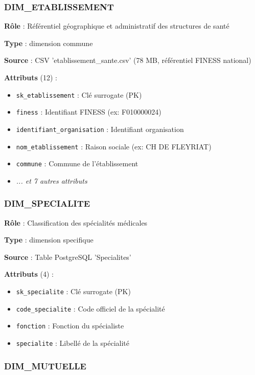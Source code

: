 \subsubsection{DIM_ETABLISSEMENT}

\textbf{Rôle} : Référentiel géographique et administratif des structures de santé

\textbf{Type} : dimension commune

\textbf{Source} : CSV 'etablissement_sante.csv' (78 MB, référentiel FINESS national)

\textbf{Attributs} (12) :
\begin{itemize}[leftmargin=*]
    \item \texttt{sk_etablissement} : Clé surrogate (PK)
    \item \texttt{finess} : Identifiant FINESS (ex: F010000024)
    \item \texttt{identifiant_organisation} : Identifiant organisation
    \item \texttt{nom_etablissement} : Raison sociale (ex: CH DE FLEYRIAT)
    \item \texttt{commune} : Commune de l'établissement
    \item \textit{... et 7 autres attributs}
\end{itemize}

\subsubsection{DIM_SPECIALITE}

\textbf{Rôle} : Classification des spécialités médicales

\textbf{Type} : dimension specifique

\textbf{Source} : Table PostgreSQL 'Specialites'

\textbf{Attributs} (4) :
\begin{itemize}[leftmargin=*]
    \item \texttt{sk_specialite} : Clé surrogate (PK)
    \item \texttt{code_specialite} : Code officiel de la spécialité
    \item \texttt{fonction} : Fonction du spécialiste
    \item \texttt{specialite} : Libellé de la spécialité
\end{itemize}

\subsubsection{DIM_MUTUELLE}


